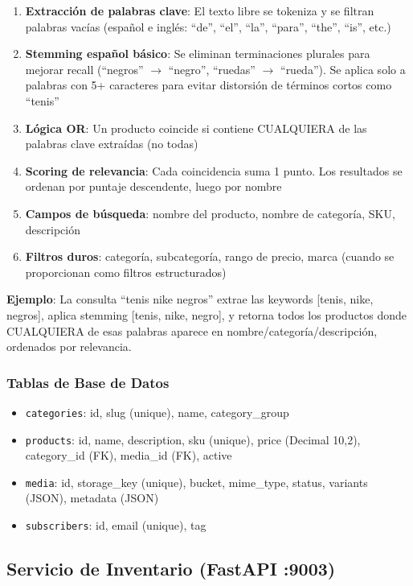 \documentclass[11pt,a4paper]{article}
\begin{document}
\begin{enumerate}
    \item \textbf{Extracción de palabras clave}: El texto libre se tokeniza y se filtran palabras vacías (español e inglés: ``de'', ``el'', ``la'', ``para'', ``the'', ``is'', etc.)
    \item \textbf{Stemming español básico}: Se eliminan terminaciones plurales para mejorar recall (``negros'' $\rightarrow$ ``negro'', ``ruedas'' $\rightarrow$ ``rueda''). Se aplica solo a palabras con 5+ caracteres para evitar distorsión de términos cortos como ``tenis''
    \item \textbf{Lógica OR}: Un producto coincide si contiene CUALQUIERA de las palabras clave extraídas (no todas)
    \item \textbf{Scoring de relevancia}: Cada coincidencia suma 1 punto. Los resultados se ordenan por puntaje descendente, luego por nombre
    \item \textbf{Campos de búsqueda}: nombre del producto, nombre de categoría, SKU, descripción
    \item \textbf{Filtros duros}: categoría, subcategoría, rango de precio, marca (cuando se proporcionan como filtros estructurados)
\end{enumerate}

\textbf{Ejemplo}: La consulta ``tenis nike negros'' extrae las keywords [tenis, nike, negros], aplica stemming [tenis, nike, negro], y retorna todos los productos donde CUALQUIERA de esas palabras aparece en nombre/categoría/descripción, ordenados por relevancia.

\subsubsection{Tablas de Base de Datos}
\begin{itemize}
    \item \texttt{categories}: id, slug (unique), name, category\_group
    \item \texttt{products}: id, name, description, sku (unique), price (Decimal 10,2), category\_id (FK), media\_id (FK), active
    \item \texttt{media}: id, storage\_key (unique), bucket, mime\_type, status, variants (JSON), metadata (JSON)
    \item \texttt{subscribers}: id, email (unique), tag
\end{itemize}

\subsection{Servicio de Inventario (FastAPI :9003)}
\end{document}
